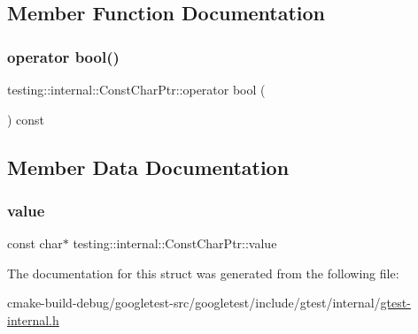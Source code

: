 \subsection{Member Function Documentation}
\mbox{\label{structtesting_1_1internal_1_1ConstCharPtr_a85c8174b5d4db8fe96863509ba767b27}} 
\subsubsection{\texorpdfstring{operator bool()}{operator bool()}}
{\footnotesize\ttfamily testing\+::internal\+::\+Const\+Char\+Ptr\+::operator bool (\begin{DoxyParamCaption}{ }\end{DoxyParamCaption}) const\hspace{0.3cm}{\ttfamily [inline]}}



\subsection{Member Data Documentation}
\mbox{\label{structtesting_1_1internal_1_1ConstCharPtr_adba40d23d5986904b605946f643cf26e}} 
\subsubsection{\texorpdfstring{value}{value}}
{\footnotesize\ttfamily const char$\ast$ testing\+::internal\+::\+Const\+Char\+Ptr\+::value}



The documentation for this struct was generated from the following file\+:\begin{DoxyCompactItemize}
\item 
cmake-\/build-\/debug/googletest-\/src/googletest/include/gtest/internal/\mbox{\hyperlink{gtest-internal_8h}{gtest-\/internal.\+h}}\end{DoxyCompactItemize}
